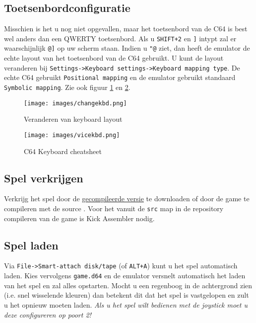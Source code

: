 \documentclass{article}
\begin{document}
\subsection{Toetsenbordconfiguratie}

Misschien is het u nog niet opgevallen, maar het toetsenbord van de C64 is best wel anders dan een QWERTY toetsenbord.
Als u \verb:SHIFT+2: en \verb:]: intypt zal er waarschijnlijk \verb:@]: op uw scherm staan.
Indien u \verb:"@: ziet, dan heeft de emulator de echte layout van het toetsenbord van de C64 gebruikt.
U kunt de layout veranderen bij \verb:Settings->Keyboard settings->Keyboard mapping type:.
De echte C64 gebruikt \verb:Positional mapping: en de emulator gebruikt standaard \verb:Symbolic mapping:.
Zie ook figuur \ref{fig:changekbd} en \ref{fig:vicekbd}.

\begin{figure}
\centering
\texttt{[image: images/changekbd.png]}
\caption{Veranderen van keyboard layout}
\label{fig:changekbd}
\end{figure}

\begin{figure}
\centering
\texttt{[image: images/vicekbd.png]}
\caption{C64 Keyboard cheatsheet}
\label{fig:vicekbd}
\end{figure}

\subsection{Spel verkrijgen}

Verkrijg het spel door de \href{TODO}{gecompileerde versie} te downloaden of door de game te compileren met de source \citep{source}. Voor het vanuit de \verb:src: map in de repository compileren van de game is Kick Assembler \citep{kickass} nodig.

\subsection{Spel laden}

Via \verb:File->Smart-attach disk/tape: (of \verb:ALT+A:) kunt u het spel automatisch laden.
Kies vervolgens \verb:game.d64: en de emulator versnelt automatisch het laden van het spel en zal alles opstarten.
Mocht u een regenboog in de achtergrond zien (i.e. snel wisselende kleuren) dan betekent dit dat het spel is vastgelopen en zult u het opnieuw moeten laden.
\emph{Als u het spel wilt bedienen met de joystick moet u deze configureren op poort 2!}
\end{document}
